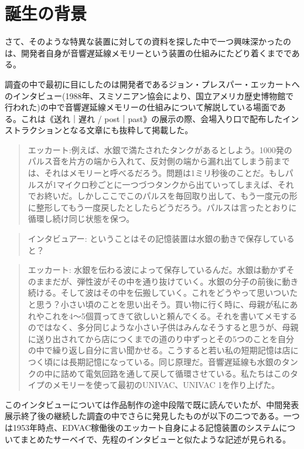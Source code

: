 \documentclass[a4paper,report]{jsbook}
\begin{document}
\section{誕生の背景}\label{ux8a95ux751fux306eux80ccux666f}

さて、そのような特異な装置に対しての資料を探した中で一つ興味深かったのは、開発者自身が音響遅延線メモリーという装置の仕組みにたどり着くまでである。

調査の中で最初に目にしたのは開発者であるジョン・プレスパー・エッカートへのインタビュー(1988年、スミソニアン協会により、国立アメリカ歴史博物館で行われた)の中で音響遅延線メモリーの仕組みについて解説している場面である。これは《送れ｜遅れ
/
post｜past》の展示の際、会場入り口で配布したインストラクションとなる文章にも抜粋して掲載した。

\begin{quote}
エッカート:例えば、水銀で満たされたタンクがあるとしよう。1000発のパルス音を片方の端から入れて、反対側の端から漏れ出てしまう前までは、それはメモリーと呼べるだろう。問題は1ミリ秒後のことだ。もしパルスが1マイクロ秒ごとに一つづつタンクから出ていってしまえば、それでお終いだ。しかしここでこのパルスを毎回取り出して、もう一度元の形に整形してもう一度戻したとしたらどうだろう。パルスは言ったとおりに循環し続け同じ状態を保つ。
\end{quote}

\begin{quote}
インタビュアー: ということはその記憶装置は水銀の動きで保存していると？
\end{quote}

\begin{quote}
エッカート:
水銀を伝わる波によって保存しているんだ。水銀は動かずそのままだが、弾性波がその中を通り抜けていく。水銀の分子の前後に動き続ける。そして波はその中を伝搬していく。これをどうやって思いついたと思う？小さい頃のことを思い出そう。買い物に行く時に、母親が私にあれやこれを4〜5個買ってきて欲しいと頼んでくる。それを書いてメモするのではなく、多分同じような小さい子供はみんなそうすると思うが、母親に送り出されてから店につくまでの道のり中ずっとその5つのことを自分の中で繰り返し自分に言い聞かせる。こうすると若い私の短期記憶は店につく頃には長期記憶になっている。同じ原理だ。音響遅延線も水銀のタンクの中に詰めて電気回路を通して戻して循環させている。私たちはこのタイプのメモリーを使って最初のUNIVAC、UNIVAC
1を作り上げた。
\end{quote}

\autocite[筆者訳]{eckertinterview}

このインタビューについては作品制作の途中段階で既に読んでいたが、中間発表展示終了後の継続した調査の中でさらに発見したものが以下の二つである。一つは1953年時点、EDVAC稼働後のエッカート自身による記憶装置のシステムについてまとめたサーベイで、先程のインタビューと似たような記述が見られる。
\end{document}
